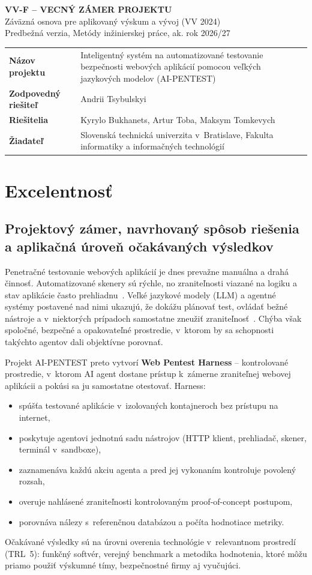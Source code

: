 \documentclass[11pt,a4paper]{article}
\newcommand{\akronym}{AI-PENTEST}
\newcommand{\bod}[1]{\subsection*{#1}}
\begin{document}
\begin{center}
  {\Large\bfseries VV-F -- VECNÝ ZÁMER PROJEKTU}\\[2pt]
  {\small Záväzná osnova pre aplikovaný výskum a vývoj (VV 2024)}\\[2pt]
  {\small Predbežná verzia, Metódy inžinierskej práce, ak. rok 2026/27}
\end{center}

\noindent
\begin{tabularx}{\textwidth}{@{}lX@{}}
\toprule
\textbf{Názov projektu} & Inteligentný systém na automatizované testovanie bezpečnosti webových aplikácií pomocou veľkých jazykových modelov (\akronym) \\
\textbf{Zodpovedný riešiteľ} & Andrii Tsybulskyi \\
\textbf{Riešitelia} & Kyrylo Bukhanets, Artur Toba, Maksym Tomkevych \\
\textbf{Žiadateľ} & Slovenská technická univerzita v~Bratislave, Fakulta informatiky a informačných technológií \\
\bottomrule
\end{tabularx}

\section{Excelentnosť}

\bod{Projektový zámer, navrhovaný spôsob riešenia a aplikačná úroveň očakávaných výsledkov}
Penetračné testovanie webových aplikácií je dnes prevažne manuálna a drahá činnosť. Automatizované skenery sú rýchle, no zraniteľnosti viazané na logiku a stav aplikácie často prehliadnu~\cite{Doupe-Johnny}. Veľké jazykové modely (LLM) a agentné systémy postavené nad nimi ukazujú, že dokážu plánovať test, ovládať bežné nástroje a v~niektorých prípadoch samostatne zneužiť zraniteľnosť~\cite{Deng-PentestGPT,Fang-HackWebsites}. Chýba však spoločné, bezpečné a opakovateľné prostredie, v~ktorom by sa schopnosti takýchto agentov dali objektívne porovnať.

Projekt \akronym{} preto vytvorí \textbf{Web Pentest Harness} -- kontrolované prostredie, v~ktorom AI agent dostane prístup k~zámerne zraniteľnej webovej aplikácii a pokúsi sa ju samostatne otestovať. Harness:
\begin{itemize}
  \item spúšťa testované aplikácie v~izolovaných kontajneroch bez prístupu na internet,
  \item poskytuje agentovi jednotnú sadu nástrojov (HTTP klient, prehliadač, skener, terminál v~sandboxe),
  \item zaznamenáva každú akciu agenta a pred jej vykonaním kontroluje povolený rozsah,
  \item overuje nahlásené zraniteľnosti kontrolovaným proof-of-concept postupom,
  \item porovnáva nálezy s~referenčnou databázou a počíta hodnotiace metriky.
\end{itemize}
Očakávané výsledky sú na úrovni overenia technológie v~relevantnom prostredí (TRL~5): funkčný softvér, verejný benchmark a metodika hodnotenia, ktoré môžu priamo použiť výskumné tímy, bezpečnostné firmy aj vyučujúci.
\end{document}
